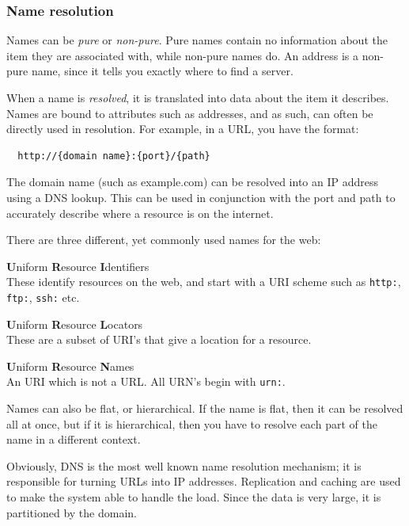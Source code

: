 \subsubsection{Name resolution}

Names can be \textit{pure} or \textit{non-pure}. Pure names contain no
information about the item they are associated with, while non-pure names do. An
address is a non-pure name, since it tells you exactly where to find a server.

When a name is \textit{resolved}, it is translated into data about the item it
describes. Names are bound to attributes such as addresses, and as such, can
often be directly used in resolution. For example, in a URL, you have the
format:

\begin{verbatim}
  http://{domain name}:{port}/{path}
\end{verbatim}

The domain name (such as example.com) can be resolved into an IP address using a
DNS lookup. This can be used in conjunction with the port and path to accurately
describe where a resource is on the internet.

There are three different, yet commonly used names for the web:

\begin{description}
  \item \textbf{U}niform \textbf{R}esource \textbf{I}dentifiers\\
    These identify resources on the web, and start with a URI scheme such as
    \texttt{http:}, \texttt{ftp:}, \texttt{ssh:} etc.
  \item \textbf{U}niform \textbf{R}esource \textbf{L}ocators\\
    These are a subset of URI's that give a location for a resource.
  \item \textbf{U}niform \textbf{R}esource \textbf{N}ames\\
    An URI which is not a URL. All URN's begin with \texttt{urn:}.
\end{description}

Names can also be flat, or hierarchical. If the name is flat, then it can be
resolved all at once, but if it is hierarchical, then you have to resolve each
part of the name in a different context.

Obviously, DNS is the most well known name resolution mechanism; it is
responsible for turning URLs into IP addresses. Replication and caching are used
to make the system able to handle the load. Since the data is very large, it is
partitioned by the domain.

